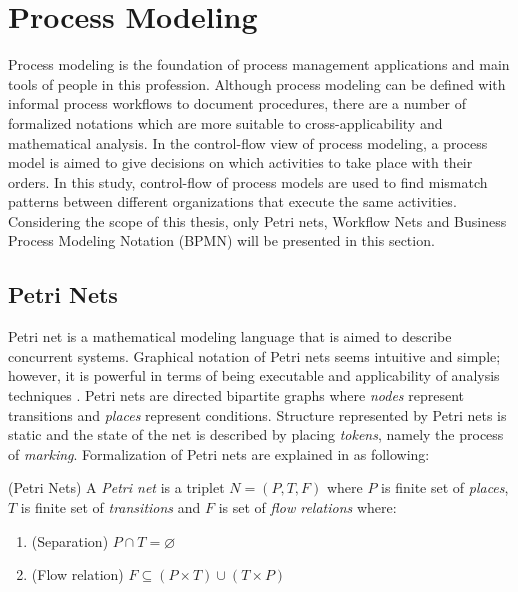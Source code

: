\section{Process Modeling}
\label{sec:process-modeling}
Process modeling is the foundation of process management applications and main tools of people in this profession. Although process modeling can be defined with informal process workflows to document procedures, there are a number of formalized notations which are more suitable to cross-applicability and mathematical analysis. In the control-flow view of process modeling, a process model is aimed to give decisions on which activities to take place with their orders. In this study, control-flow of process models are used to find mismatch patterns between different organizations that execute the same activities. Considering the scope of this  thesis, only Petri nets, Workflow Nets and Business Process Modeling Notation (BPMN) will be presented in this section. 

\subsection{Petri Nets}
\label{sec:petri-nets}
Petri net is a mathematical modeling language that is aimed to describe concurrent systems. Graphical notation of Petri nets seems intuitive and simple; however, it is powerful in terms of being executable and applicability of analysis techniques \cite{vanderAalst:2011:MBP:2000715}. Petri nets are directed bipartite graphs where \textit{nodes} represent transitions and \textit{places} represent conditions. Structure represented by Petri nets is static and the state of the net is described by placing \textit{tokens}, namely the process of \textit{marking}. Formalization of Petri nets are explained in \cite{reisig1998lectures} as following:
\theoremstyle{definition}
\begin{definition}{}
(Petri Nets) A \textit{Petri net} is a triplet $N = (P, T, F)$ where $P$ is finite set of \textit{places}, $T$ is finite set of \textit{transitions} and $F$ is set of \textit{flow relations} where:
\begin{enumerate}
  \item (Separation) $P \cap T = \varnothing$
  \item (Flow relation) $F \subseteq (P \times T) \cup (T \times P)$
\end{enumerate}
\end{definition}

